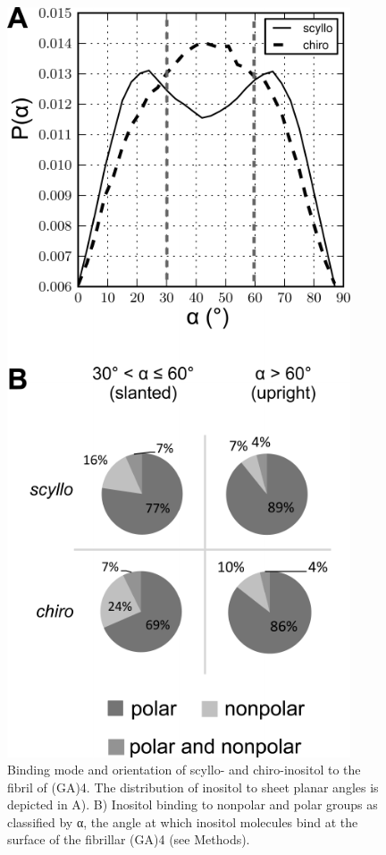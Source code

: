 \begin{figure}[ht]
  \centering
  \includegraphics[width=4in]{figures/results1/GA4_paper_figures_submitted-8}
  \caption[Binding mode and orientation of scyllo- and chiro-inositol to the fibril of \gafour.]{Binding mode and orientation of scyllo- and chiro-inositol to the fibril of (GA)4. The distribution of inositol to sheet planar angles is depicted in A). B) Inositol binding to nonpolar and polar groups as classified by α, the angle at which inositol molecules bind at the surface of the fibrillar (GA)4 (see Methods).}
   \label{fig:figure8}
\end{figure}

